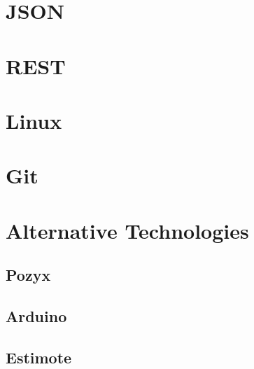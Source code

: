 \documentclass[../Main/thesis.tex]{subfiles}
\begin{document}
\section{JSON}

\section{REST}

\section{Linux}

\section{Git}


\section{Alternative Technologies}
\subsection{Pozyx}
\subsection{Arduino}
\subsection{Estimote}



\onlyinsubfile{}
\onlyinsubfile{}
\end{document}
